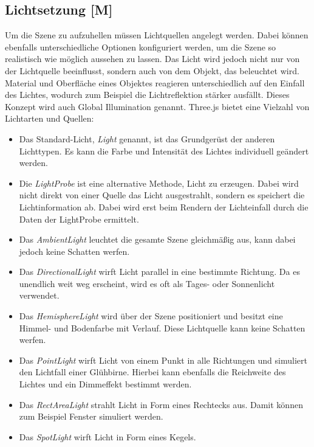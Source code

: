 \newpage
\subsection{Lichtsetzung [M]}
\label{lichtsetzung}
Um die Szene zu aufzuhellen müssen Lichtquellen angelegt werden. Dabei können ebenfalls unterschiedliche Optionen konfiguriert werden, um die Szene so realistisch wie möglich aussehen zu lassen. Das Licht wird jedoch nicht nur von der Lichtquelle beeinflusst, sondern auch von dem Objekt, das beleuchtet wird. Material und Oberfläche eines Objektes reagieren unterschiedlich auf den Einfall des Lichtes, wodurch zum Beispiel die Lichtreflektion stärker ausfällt. Dieses Konzept wird auch Global Illumination genannt. Three.js bietet eine Vielzahl von Lichtarten und Quellen:

\begin{itemize}
    \item Das Standard-Licht, \emph{Light} genannt, ist das Grundgerüst der anderen Lichttypen. Es kann die Farbe und Intensität des Lichtes individuell geändert werden. \cite{StandardLight}
    \item Die \emph{LightProbe} ist eine alternative Methode, Licht zu erzeugen. Dabei wird nicht direkt von einer Quelle das Licht ausgestrahlt, sondern es speichert die Lichtinformation ab. Dabei wird erst beim Rendern der Lichteinfall durch die Daten der LightProbe ermittelt.  \cite{LightProbe}
    \item Das \emph{AmbientLight} leuchtet die gesamte Szene gleichmäßig aus, kann dabei jedoch keine Schatten werfen. \cite{AmbientLight}
    \item Das \emph{DirectionalLight} wirft Licht parallel in eine bestimmte Richtung. Da es unendlich weit weg erscheint, wird es oft als Tages- oder Sonnenlicht verwendet. \cite{DirectionalLight}
    \item Das \emph{HemisphereLight} wird über der Szene positioniert und besitzt eine Himmel- und Bodenfarbe mit Verlauf. Diese Lichtquelle kann keine Schatten werfen. \cite{HemisphereLight}
    \item Das \emph{PointLight} wirft Licht von einem Punkt in alle Richtungen und simuliert den Lichtfall einer Glühbirne. Hierbei kann ebenfalls die Reichweite des Lichtes und ein Dimmeffekt bestimmt werden. \cite{PointLight}
    \item Das \emph{RectAreaLight} strahlt Licht in Form eines Rechtecks aus. Damit können zum Beispiel Fenster simuliert werden. \cite{ReactAreaLight}
    \item Das \emph{SpotLight} wirft Licht in Form eines Kegels. \cite{SpotLight}
\end{itemize}

